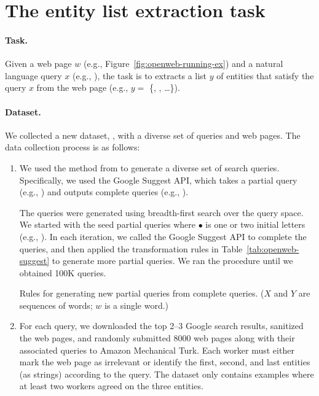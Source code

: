 \section{The entity list extraction task}

\paragraph{Task.}
Given a web page $w$ (e.g., Figure~\ref{fig:openweb-running-ex})
and a natural language query $x$
(e.g., ),
the task is to extracts a list $y$ of entities
that satisfy the query $x$
from the web page
(e.g., $y=$
\{, , \dots\}).

\paragraph{Dataset.}
We collected a new dataset, ,
with a diverse set of queries and web pages.
The data collection process is as follows:

\begin{enumerate}
\item
We used the method from \citet{berant2013freebase}
to generate a diverse set of search queries.
Specifically, we used the Google Suggest API,
which takes a partial query
(e.g., )
and outputs complete queries
(e.g., ).

The queries were generated using breadth-first search
over the query space.
We started with the seed partial queries
where $\bullet$ is one or two initial letters
(e.g., ).
In each iteration, we called the Google Suggest API
to complete the queries,
and then applied the transformation rules in
Table~\ref{tab:openweb-suggest}
to generate more partial queries.
We ran the procedure until we obtained 100K queries.

\begin{table}[t]
\centering

\caption[
Rules for generating new partial queries
from complete queries.
]{Rules for generating new partial queries
from complete queries.
($X$ and $Y$ are sequences of words; $w$ is a single word.)}
\label{tab:openweb-suggest}
\end{table}

\item
For each query,
we downloaded the top 2--3 Google search results,
sanitized the web pages,
and randomly submitted 8000 web pages
along with their associated queries
to Amazon Mechanical Turk.
Each worker must either mark the web page
as irrelevant or identify the first, second,
and last entities (as strings) according to the query.
The dataset only contains examples where at least
two workers agreed on the three entities.
\end{enumerate}

